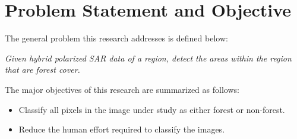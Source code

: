 \section{Problem Statement and Objective}

The general problem this research addresses is defined below:

\textit{Given hybrid polarized SAR data of a region, detect the areas within the region that are forest cover.}

The major objectives of this research are summarized as follows:
\begin{itemize}
\item Classify all pixels in the image under study as either forest or non-forest.  
\item Reduce the human effort required to classify the images.  
\end{itemize}



